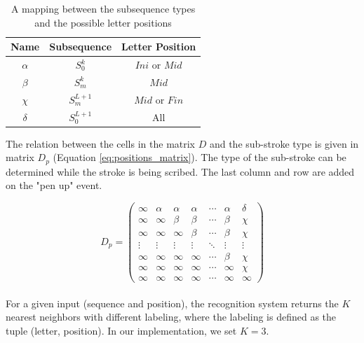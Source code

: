 \documentclass[10pt, conference, compsocconf]{IEEEtran}
\begin{document}
\begin{table}
\centering
\renewcommand{\arraystretch}{1.3}
\caption{A mapping between the subsequence types and the possible letter positions}
\begin{tabular}{| c |c | c |}
\hline
  Name     & Subsequence    & Letter Position       \\
\hline
  $\alpha$ & $S_0^{k}$         & $Ini$ or $Mid$  \\
\hline
  $\beta$  & $S_{m}^{k}$     & $Mid$              \\
\hline
  $\chi$    & $S_{m}^{L+1}$ & $Mid$ or $Fin$   \\
\hline
  $\delta$ & $S_0^{L+1}$     & All                   \\
\hline
\end{tabular}
\label{table:subsequences_types}
\end{table}

The relation between the cells in the matrix $D$ and the sub-stroke type is given in matrix $D_p$  (Equation \ref{eq:positions_matrix}). 
The type of the sub-stroke can be determined while the stroke is being scribed.
The last column and row are added on the "pen up" event.


\begin{equation}
D_{p}=
\left( 
\begin{array}{ccccccc}
\infty 	& \alpha & \alpha & \alpha  & \cdots & \alpha & \delta \\
\infty  & \infty  & \beta   & \beta   & \cdots  & \beta  & \chi    \\
\infty  & \infty  & \infty   & \beta   & \cdots  & \beta  & \chi    \\
\vdots & \vdots & \vdots  & \vdots & \ddots  & \vdots & \vdots \\
\infty  & \infty  & \infty   & \infty   & \cdots  & \beta  & \chi    \\
\infty  & \infty  & \infty   & \infty   & \cdots  & \infty  & \chi    \\
\infty  & \infty  & \infty   & \infty   & \cdots  & \infty  & \infty \end{array} \right)
\label{eq:positions_matrix}
\end{equation}\\

For a given input (sequence and position), the recognition system returns the $K$ nearest neighbors with different labeling, where the labeling is defined as the tuple (letter, position). In our implementation, we set $K=3$.
\end{document}
